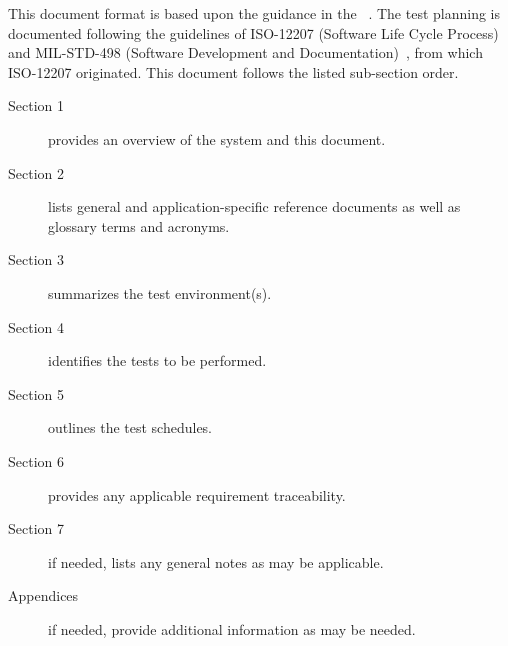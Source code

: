 This document format is based upon the guidance in the \STP \DID~\cite{ref__STP_DID}.
The test planning is documented following the guidelines of ISO-12207 (Software Life Cycle Process)~\cite{ref__ISO_12207} and MIL-STD-498 (Software Development and Documentation)~\cite{ref__MIL_STD_498}, from which ISO-12207 originated.
This document follows the listed \STP sub-section order.
\begin{description}
	\item[Section 1] provides an overview of the system and this document.
	\item[Section 2] lists general and application-specific reference documents as well as glossary terms and acronyms. 
	\item[Section 3] summarizes the test environment(s).
	\item[Section 4] identifies the tests to be performed. 
	\item[Section 5] outlines the test schedules.
	\item[Section 6] provides any applicable requirement traceability.
	\item[Section 7] if needed, lists any general notes as may be applicable.
	\item[Appendices] if needed, provide additional information as may be needed.
\end{description}